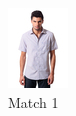 \begin{figure}[H]
\begin{subfigure}[b]{0.19\textwidth}
      \includegraphics[width=\textwidth]{images/2output3.jpeg}
      \caption{Match 1}
  \end{subfigure}
  \begin{subfigure}[b]{0.19\textwidth}

\end{subfigure}
\end{figure}
